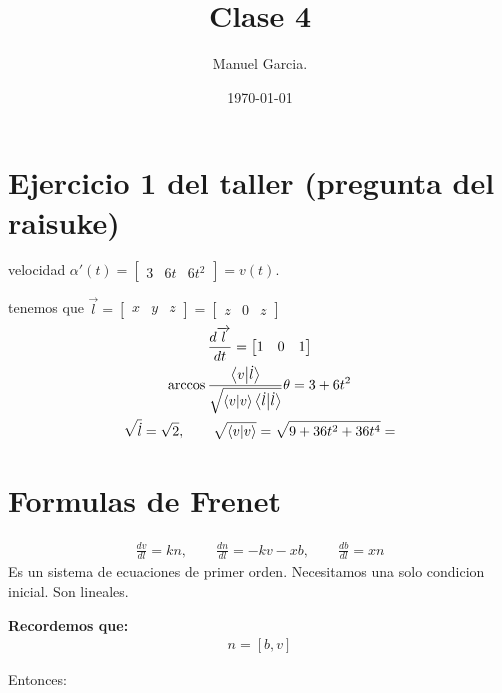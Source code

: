 \documentclass{article}
\title{Clase 4 }
\author{Manuel Garcia.}
\date{\today}
\newcommand{\caja}[3]{%
  \begin{tcolorbox}[colback=#1!5!white,colframe=#1!25!black,title=#2]
    #3
  \end{tcolorbox}%
}
\begin{document}
\maketitle

\section{Ejercicio 1 del taller (pregunta  del raisuke)}
velocidad $ \alpha' (t) = \begin{bmatrix} 3 & 6t  & 6t ^2 \end{bmatrix} = v(t)   $.

tenemos que $ \overrightarrow l = \begin{bmatrix} x & y & z \end{bmatrix} = \begin{bmatrix} z & 0 & z \end{bmatrix}   $
\begin{gather}
  \frac{d \overrightarrow l  }{d t } = \begin{bmatrix} 1 & 0 & 1 \end{bmatrix}  \\
  \arccos{\frac{\bra{v}\ket{\dot l } }{\sqrt{\bra{v}\ket{v}\bra{\dot l }\ket{\dot l }  } }\theta} = 3+6t ^2\\
  \sqrt{\dot l }  = \sqrt{2 },\qquad \sqrt{\bra{v }\ket{v} } = \sqrt{9+36t ^2+36 t ^ {4 }} = 
\end{gather}

\section{Formulas de Frenet }
\caja{red}{Formulas de frenet }{
  \begin{gather}
    \frac{d v }{d l} = kn , \qquad \frac{d n }{d l} = -kv-xb, \qquad \frac{d b  }{d l } = xn  
    \label{eq:formulas_frenet}
  \end{gather}
  Es un sistema de ecuaciones de primer orden. Necesitamos una solo condicion inicial. Son lineales.
}
\textbf{Recordemos que:}
\begin{gather}
  n = [b,v]
\end{gather}

Entonces:
\end{document}
